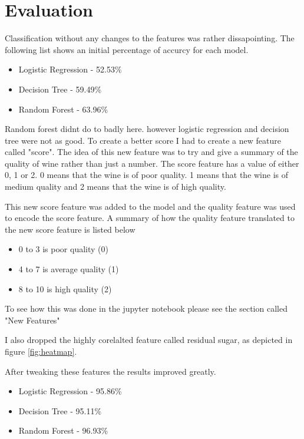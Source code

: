 \section{Evaluation}

Classification without any changes to the features was rather dissapointing. The following list shows an initial percentage of accurcy for each model.

\begin{itemize}
  \item Logistic Regression - 52.53\%
  \item Decision Tree - 59.49\%
  \item Random Forest - 63.96\%
\end{itemize}

Random forest didnt do to badly here. however logistic regression and decision tree were not as good. To create a better score I had to create a new feature called "score". The idea of this new feature was to try and give a summary of the quality of wine rather than just a number. The score feature has a value of either 0, 1 or 2. 0 means that the wine is of poor quality. 1 means that the wine is of medium quality and 2 means that the wine is of high quality. 

This new score feature was added to the model and the quality feature was used to encode the score feature. A summary of how the quality feature translated to the new score feature is listed below

\begin{itemize}
  \item 0 to 3 is poor quality (0)
  \item 4 to 7 is average quality (1)
  \item 8 to 10 is high quality (2)
\end{itemize}

To see how this was done in the jupyter notebook please see the section called "New Features"

I also dropped the highly corelalted feature called residual sugar, as depicted in figure \ref{fig:heatmap}. 

After tweaking these features the results improved greatly.

\begin{itemize}
  \item Logistic Regression - 95.86\%
  \item Decision Tree - 95.11\%
  \item Random Forest - 96.93\%
\end{itemize}

